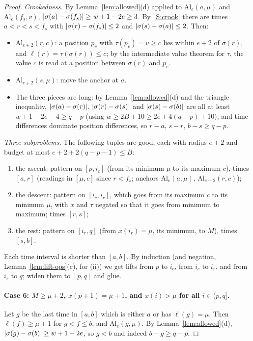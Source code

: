 \begin{proof}
\emph{Crookedness.} By Lemma~\ref{lem:allowed}(d) applied to $\mathrm{Al}_e(a,\mu)$ and $\mathrm{Al}_e(f_s,v)$,
$\left\lvert \sigma(a)-\sigma(f_s)\right\rvert\ge w+1-2e\ge3$. By~\ref{S:crook} there are times $a<r<s<f_s$ with
$\left\lvert \sigma(r)-\sigma(f_s)\right\rvert\le2$ and $\left\lvert \sigma(s)-\sigma(a)\right\rvert\le2$. Then:
\begin{itemize}
\item $\mathrm{Al}_{e+2}(r,c)$: a position $p_v$ with $\tau(p_v)=v\ge c$ lies within $e+2$ of $\sigma(r)$, and
$\ell(r)=\tau(\sigma(r))\le c$; by the intermediate value theorem for $\tau$, the value $c$ is read at a position between
$\sigma(r)$ and $p_v$.
\item $\mathrm{Al}_{e+2}(s,\mu)$: move the anchor at $a$.
\item The three pieces are long: by Lemma~\ref{lem:allowed}(d) and the triangle inequality, $\left\lvert \sigma(a)-\sigma(r)\right\rvert$,
$\left\lvert \sigma(r)-\sigma(s)\right\rvert$ and $\left\lvert \sigma(s)-\sigma(b)\right\rvert$ are all at least $w+1-2e-4\ge q-p$ (using $w\ge2B+10\ge
2e+4(q-p)+10$), and time differences dominate position differences, so $r-a$, $s-r$, $b-s\ge q-p$.
\end{itemize}

\emph{Three subproblems.} The following tuples are good, each with radius $e+2$ and budget at most $e+2+2(q-p-1)\le B$:
\begin{enumerate}[label=(\roman*)]
\item the ascent: pattern on $[p,i_c]$ (from its minimum $\mu$ to its maximum $c$), times $[a,r]$ (readings in $[\mu,c]$
since $r<f_s$; anchors $\mathrm{Al}_e(a,\mu)$, $\mathrm{Al}_{e+2}(r,c)$);
\item the descent: pattern on $[i_c,i_r]$, which goes from its maximum $c$ to its minimum $\mu$, with $x$ and $\tau$
negated so that it goes from minimum to maximum; times $[r,s]$;
\item the rest: pattern on $[i_r,q]$ (from $x(i_r)=\mu$, its minimum, to $M$), times $[s,b]$.
\end{enumerate}
Each time interval is shorter than $[a,b]$. By induction (and negation, Lemma~\ref{lem:lift-ops}(c), for (ii)) we get
lifts from $p$ to $i_c$, from $i_c$ to $i_r$, and from $i_r$ to $q$; widen them to $[p,q]$ and glue.

\paragraph{Case 6: $M\ge\mu+2$, $x(p+1)=\mu+1$, and $x(i)>\mu$ for all $i\in(p,q]$.}
Let $g$ be the last time in $[a,b]$ which is either $a$ or has $\ell(g)=\mu$. Then $\ell(f)\ge\mu+1$ for $g<f\le b$, and
$\mathrm{Al}_e(g,\mu)$. By Lemma~\ref{lem:allowed}(d), $\left\lvert \sigma(g)-\sigma(b)\right\rvert\ge w+1-2e$, so $g<b$ and indeed $b-g\ge
q-p$.


\end{proof}
